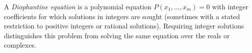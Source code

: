 
A \emph{Diophantine equation} is a polynomial equation $P(x_1,\ldots,x_m)=0$ with integer coefficients for which solutions in integers are sought (sometimes with a stated restriction to positive integers or rational solutions). Requiring integer solutions distinguishes this problem from solving the same equation over the reals or complexes.
